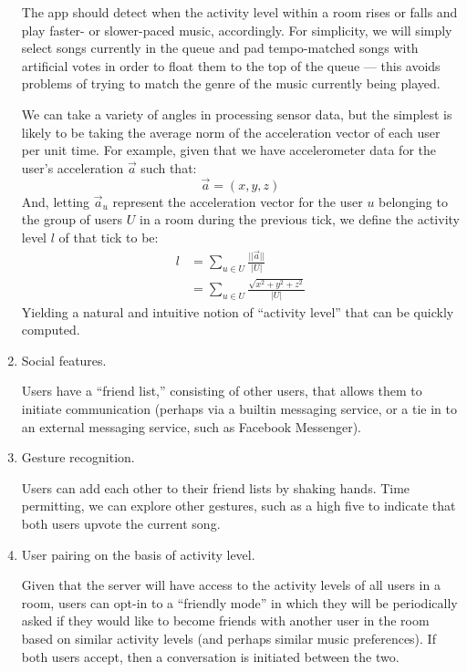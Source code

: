 \documentclass[12pt]{article}
\begin{document}
\begin{enumerate}
The app should detect when the activity level within a room rises or
falls and play faster- or slower-paced music, accordingly. For
simplicity, we will simply select songs currently in the queue and pad
tempo-matched songs with artificial votes in order to float them to
the top of the queue --- this avoids problems of trying to match the
genre of the music currently being played.

We can take a variety of angles in processing sensor data, but the
simplest is likely to be taking the average norm of the acceleration
vector of each user per unit time. For example, given that we have
accelerometer data for the user's acceleration $\vec{a}$ such that:
\[
\vec{a} = (x, y, z)
\]
And, letting $\vec{a}_u$ represent the acceleration vector for the user
$u$ belonging to the group of users $U$ in a room during the previous
tick, we define the activity level $l$ of that tick to be:
\begin{align*}
  l &= \sum_{u \in U} \frac{||\vec{a}||}{|U|}\\
  &= \sum_{u \in U} \frac{\sqrt{x^2 + y^2 + z^2}}{|U|}
\end{align*}
Yielding a natural and intuitive notion of ``activity level'' that can
be quickly computed.


\item Social features.

Users have a ``friend list,'' consisting of other users, that allows
them to initiate communication (perhaps via a builtin messaging
service, or a tie in to an external messaging service, such as
Facebook Messenger).

\item Gesture recognition.

Users can add each other to their friend lists by shaking hands. Time
permitting, we can explore other gestures, such as a high five to
indicate that both users upvote the current song.

\item User pairing on the basis of activity level.

Given that the server will have access to the activity levels of all
users in a room, users can opt-in to a ``friendly mode'' in which they
will be periodically asked if they would like to become friends with
another user in the room based on similar activity levels (and perhaps
similar music preferences). If both users accept, then a conversation
is initiated between the two.

\end{enumerate}
\end{document}
